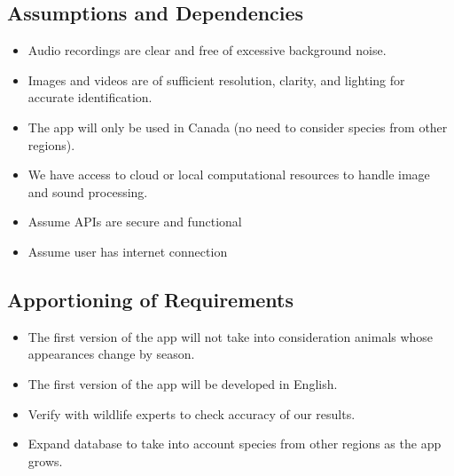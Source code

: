 \documentclass[]{article}
\begin{document}
\subsection{Assumptions and Dependencies}
\label{sub:assumptions_and_dependencies}
\begin{itemize}
	\item Audio recordings are clear and free of excessive background noise.
	\item Images and videos are of sufficient resolution, clarity, and lighting for accurate identification.
    \item The app will only be used in Canada (no need to consider species from other regions).
    \item We have access to cloud or local computational resources to handle image and sound processing.
    \item Assume APIs are secure and functional
    \item Assume user has internet connection
    
\end{itemize}


\subsection{Apportioning of Requirements}
\label{sub:apportioning_of_requirements}
\begin{itemize}
	\item The first version of the app will not take into consideration animals whose appearances change by season.
    \item The first version of the app will be developed in English.
    \item Verify with wildlife experts to check accuracy of our results.
    \item Expand database to take into account species from other regions as the app grows.
\end{itemize}
\end{document}
